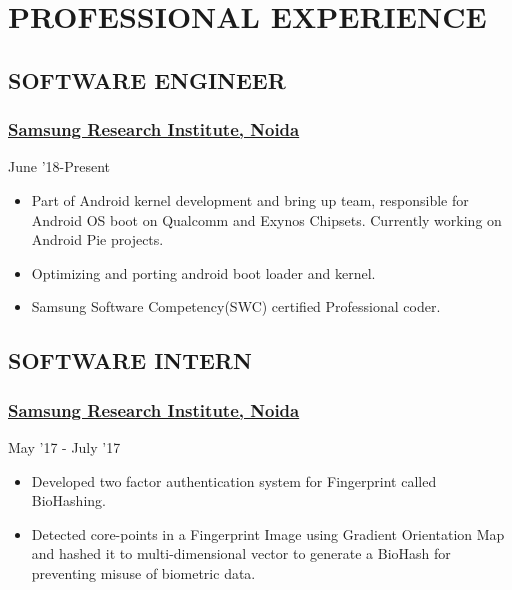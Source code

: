 \documentclass[letterpaper]{twentysecondcv} %
\begin{document}
\section{PROFESSIONAL EXPERIENCE}
\subsection{SOFTWARE ENGINEER}\subsubsection{\href{https://research.samsung.com/sri-n}{Samsung Research Institute, Noida}}  \hfill{} June '18-Present
\begin{itemize}
    \item Part of Android kernel development and bring up team, responsible for Android OS boot on Qualcomm and Exynos Chipsets. Currently working on Android Pie projects.
    \item Optimizing and porting android boot loader and kernel.
    \item Samsung Software Competency(SWC) certified Professional coder.
\end{itemize}
\subsection{SOFTWARE INTERN}\subsubsection{\href{https://research.samsung.com/sri-n}{Samsung Research Institute, Noida}}\hfill{}  May '17 - July '17
\begin{itemize}
    \item Developed two factor authentication system for Fingerprint called BioHashing.
\item Detected core-points in a Fingerprint Image using Gradient Orientation Map and hashed it to multi-dimensional vector to generate a BioHash for preventing misuse of biometric data.
\end{itemize}
\end{document}
